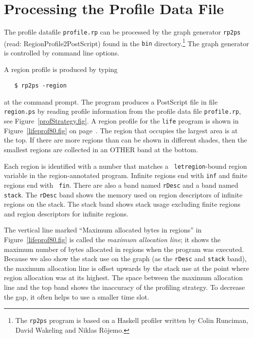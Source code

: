 \documentclass[12pt]{book}
\begin{document}
\section{Processing the Profile Data File}
The profile datafile {\tt profile.rp} can be processed by the 
%
graph generator {\tt rp2ps} (read: RegionProfile2PostScript) found in
the {\tt bin} directory.\footnote{The {\tt rp2ps} program is based on
  a Haskell profiler written by Colin Runciman, David Wakeling and Niklas
  R\"{o}jemo.} The graph generator is controlled by command line
options.

A 
%
%
region profile is produced by typing
\begin{verbatim}
   $ rp2ps -region
\end{verbatim}
at the command prompt. The program produces a PostScript file in
file {\tt region.ps} by reading profile information from the 
%
profile data file {\tt profile.rp}, see Figure~\ref{profStrategy.fig}.
A region profile for the {\tt life} program is shown in
Figure~\ref{lifeprof80.fig} on page~\pageref{lifeprof80.fig}. The
region that occupies the largest area is at the top. If there are more
regions than can be shown in different shades, then the smallest
regions are collected in an OTHER band at the bottom.

Each region is identified with a number that matches a {\tt
  letregion}-bound region variable in the region-annotated program.
Infinite regions end with {\tt inf} and finite regions end with {\tt
  fin}. There are also a band named {\tt rDesc} and a band named
{\tt stack}. The {\tt rDesc} band shows the memory used on
region descriptors of infinite regions on the stack. The stack band
shows stack usage excluding finite regions and region descriptors for
infinite regions.

The vertical line marked ``Maximum allocated bytes in regions'' in
Figure~\ref{lifeprof80.fig} is called the {\em maximum allocation
  line}; it shows the maximum number of bytes allocated in regions
when the program was executed. Because we also show the stack use on
the graph (as the {\tt rDesc} and {\tt stack} band), the maximum
allocation line is offset upwards by the stack use at the point where
region allocation was at its highest. The space between the maximum
allocation line and the top band shows the inaccuracy of the profiling
strategy. To decrease the gap, it often helps to use a smaller time
slot.
\end{document}
